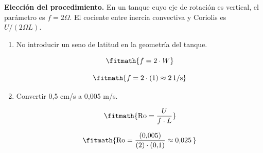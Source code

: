 \noindent\textbf{Elección del procedimiento.} En un tanque cuyo eje de rotación es vertical, el parámetro es $f=2\Omega$. El cociente entre inercia convectiva y Coriolis es $U/(2\Omega L)$.

\begin{enumerate}

\item No introducir un seno de latitud en la geometría del tanque.

\[\fitmath{f=2\cdot W}\]

\[\fitmath{f=2\cdot (1)\approx 2\,\mathrm{1/s}}\]

\item Convertir 0,5 cm/s a 0,005 m/s.

\[\fitmath{\mathrm{Ro}=\frac{U}{f\cdot L}}\]

\[\fitmath{\mathrm{Ro}=\frac{(0{,}005)}{(2)\cdot (0{,}1)}\approx 0{,}025\,}\]

\end{enumerate}
